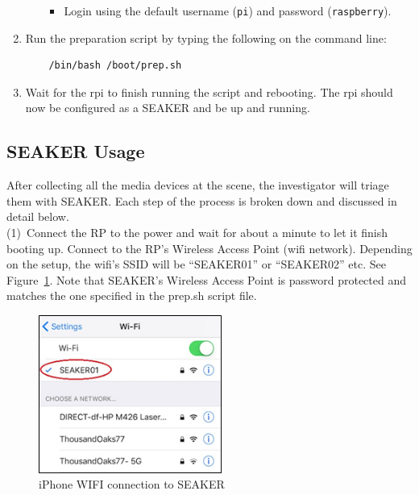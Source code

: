 \documentclass[12pt]{article}
\begin{document}
\begin{enumerate}
\begin{itemize}
\begin{itemize}
\begin{verbatim}
        \end{verbatim}
        \item Login using the default username (\verb|pi|) and password
        (\verb|raspberry|).
      \end{itemize}
    \end{itemize}
  \item Run the preparation script by typing the following on the command line:
  \begin{verbatim}
    /bin/bash /boot/prep.sh
  \end{verbatim}
  \item Wait for the \gls{rpi} to finish running the script and
  rebooting. The \gls{rpi} should now be configured as a SEAKER
  and be up and running.
\end{enumerate}

\newpage
\subsection{SEAKER Usage}

After collecting all the media devices at the scene, the investigator
will triage them with SEAKER.  Each step of the process is broken
down and discussed in detail below.\\

(1)~Connect the RP to the power and wait for about a minute
to let it finish booting up.
Connect to the RP's Wireless Access Point (\gls{wifi} network). Depending
on the setup, the \gls{wifi}'s SSID will be ``SEAKER01'' or ``SEAKER02''
etc.  See Figure~\ref{fig:screen-1}. Note that SEAKER's Wireless Access
Point is password
protected and matches the one specified in the prep.sh script file.\\

\begin{figure}[ht]
  \begin{center}
  \includegraphics[width=6cm]{images/seaker-hh-screen-1.jpg}
  \caption{iPhone WIFI connection to SEAKER}
  \label{fig:screen-1}
  \end{center}
\end{figure}
\end{document}
